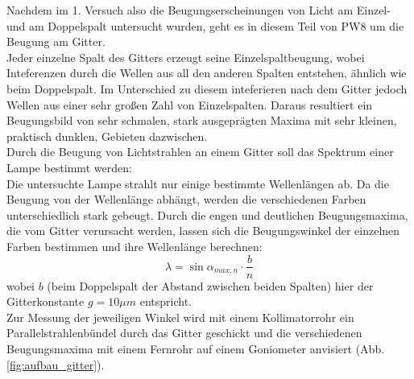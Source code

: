 \documentclass[12pt,a4paper]{article}
\begin{document}
\begin{multicols}{2}
Nachdem im 1. Versuch also die Beugungserscheinungen von Licht am Einzel- und am Doppelspalt
untersucht wurden, geht es in diesem Teil von PW8 um die Beugung am Gitter.\\
Jeder einzelne Spalt des Gitters erzeugt seine Einzelspaltbeugung, wobei Inteferenzen durch die Wellen aus all den anderen Spalten entstehen, ähnlich wie beim Doppelspalt. Im Unterschied zu diesem inteferieren nach dem Gitter jedoch Wellen aus einer sehr großen Zahl von Einzelspalten.
Daraus resultiert ein Beugungsbild von sehr schmalen, stark ausgeprägten Maxima mit sehr kleinen, praktisch dunklen, Gebieten dazwischen.\\
Durch die Beugung von Lichtstrahlen an einem Gitter soll das Spektrum einer Lampe bestimmt werden:\\
Die untersuchte Lampe strahlt nur einige bestimmte Wellenlängen ab. Da die Beugung von der Wellenlänge abhängt, werden die verschiedenen Farben unterschiedlich stark gebeugt. Durch die engen und deutlichen Beugungsmaxima, die vom Gitter verursacht werden, lassen sich die Beugungswinkel der einzelnen Farben bestimmen und ihre Wellenlänge berechnen:
$$\lambda = \sin{\alpha_{max,n}}\cdot \frac{b}{n}$$
wobei $b$ (beim Doppelspalt der Abstand zwischen beiden Spalten) hier der Gitterkonstante $g=10 \mu m$ entspricht.\\
Zur Messung der jeweiligen Winkel wird mit einem Kollimatorrohr ein Parallelstrahlenbündel durch das Gitter geschickt und die verschiedenen Beugungsmaxima mit einem Fernrohr auf einem Goniometer anvisiert (Abb. \ref{fig:aufbau_gitter}).\\
\begin{figure}[H]
	\centering

\end{figure}
\end{multicols}
\end{document}
